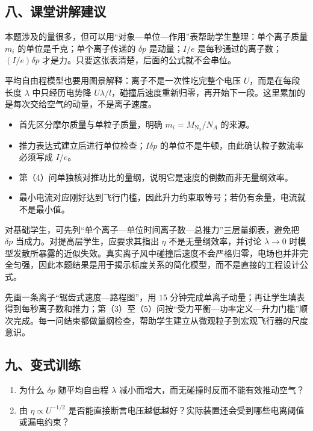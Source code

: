 \documentclass[12pt,a4paper,UTF8]{ctexart}
\newcommand{\tightlist}{\setlength{\itemsep}{0pt}\setlength{\parskip}{0pt}}
\begin{document}
\subsection{八、课堂讲解建议}\label{ux516bux8bfeux5802ux8bb2ux89e3ux5efaux8bae-3}

本题涉及的量很多，但可以用``对象---单位---作用''表帮助学生整理：单个离子质量
\(m_i\) 的单位是千克；单个离子传递的 \(\delta p\) 是动量；\(I/e\)
是每秒通过的离子数；\((I/e)\delta p\)
才是力。只要这张表清楚，后面的公式就不会串位。

平均自由程模型也要用图景解释：离子不是一次性吃完整个电压
\(U\)，而是在每段长度 \(\lambda\) 中只经历电势降
\(U\lambda/l\)，碰撞后速度重新归零，再开始下一段。这里累加的是每次交给空气的动量，不是离子速度。

\begin{itemize}
\tightlist
\item
  首先区分摩尔质量与单粒子质量，明确 \(m_i=M_{\mathrm{N_2}}/N_A\)
  的来源。
\item
  推力表达式建立后进行单位检查；\(I\delta p\)
  的单位不是牛顿，由此确认粒子数流率必须写成 \(I/e\)。
\item
  第（4）问单独核对推功比的量纲，说明它是速度的倒数而非无量纲效率。
\item
  最小电流对应刚好达到飞行门槛，因此升力约束取等号；若仍有余量，电流就不是最小值。
\end{itemize}

对基础学生，可先列``单个离子---单位时间离子数---总推力''三层量纲表，避免把
\(\delta p\) 当成力。对提高层学生，应要求其指出 \(\eta\)
不是无量纲效率，并讨论 \(\lambda\to0\)
时模型发散所暴露的近似失效。真实离子风中碰撞后速度不会严格归零，电场也并非完全匀强，因此本题结果是用于揭示标度关系的简化模型，而不是直接的工程设计公式。

先画一条离子``锯齿式速度---路程图''，用 \(15\)
分钟完成单离子动量；再让学生填表得到每秒离子数和推力；第（3）至（5）问按``受力平衡---功率定义---升力门槛''顺次完成。每一问结束都做量纲检查，帮助学生建立从微观粒子到宏观飞行器的尺度意识。

\subsection{九、变式训练}\label{ux4e5dux53d8ux5f0fux8badux7ec3-3}

\begin{enumerate}
\def\labelenumi{\arabic{enumi}.}
\tightlist
\item
  为什么 \(\delta p\) 随平均自由程 \(\lambda\)
  减小而增大，而无碰撞时反而不能有效推动空气？
\item
  由 \(\eta\propto U^{-1/2}\)
  是否能直接断言电压越低越好？实际装置还会受到哪些电离阈值或漏电约束？
\end{enumerate}
\end{document}
